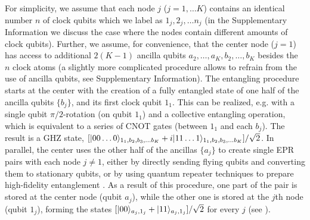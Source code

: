 For simplicity, we assume that each node $j$ ($j=1,\dots K$) contains an
identical number $n$ of clock qubits which we label as $1_j, 2_j,\dots n_j$ (in
the Supplementary Information we discuss the case where the nodes contain
different amounts of clock qubits).
Further, we assume, for convenience, that the center node ($j=1$) has access to
additional $2(K-1)$ ancilla qubits $a_2,\dots, a_K,b_2,\dots,b_K$ besides the
$n$ clock atoms (a slightly more complicated procedure allows to refrain from
the use of ancilla qubits, see Supplementary Information).
The entangling procedure starts at the center with the creation of a fully
entangled state of one half of the ancilla qubits $\{b_j\}$, and its first clock
qubit $1_1$. 
This can be realized, e.g.  with a single qubit $\pi/2$-rotation
(on qubit $1_1$)
and a collective entangling operation, which is equivalent to a series of
CNOT gates \cite{Nielsen_Chuang} (between $1_1$ and each $b_j$).
The result is a GHZ state, $[| 00\dots 0 \rangle_{1_1,b_2,b_3,\dots b_K} +
i| 11\dots 1 \rangle_{1_1,b_2,b_3,\dots b_K}]/\sqrt{2}$.
In parallel, the center uses the other half of the ancillas $\{a_j\}$ to create single EPR pairs with each node $j\neq1$,
either by directly sending flying qubits and converting them to stationary
qubits, or by using quantum repeater techniques to prepare high-fidelity entanglement \cite{duan3}. As a result of this procedure, 
one part of the pair is stored at the center node (qubit $a_j$), while the other one
is stored at the $j$th  node (qubit $1_j$), forming the states $[| 00 \rangle_{a_j,1_j} +
| 11 \rangle_{a_j,1_j}]/\sqrt{2}$ for every $j$ (see ).
